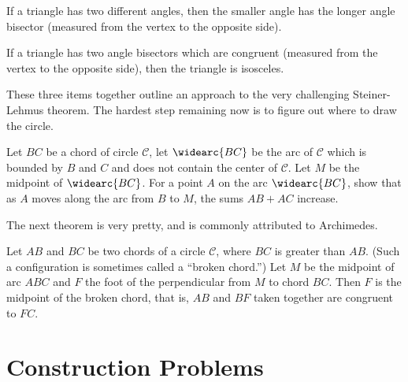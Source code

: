 \begin{conjecture}
If a triangle has two different angles, then the smaller angle has the longer angle bisector (measured from the vertex to the opposite side).
\end{conjecture}

\begin{conjecture}
If a triangle has two angle bisectors which are congruent (measured from the vertex to the opposite side), then the triangle is isosceles.
\end{conjecture}

\begin{annotation}
{
\color{blue}
These three items together outline an approach to the very challenging Steiner-Lehmus theorem. The hardest step remaining now is to figure out where to draw the circle.
}
\end{annotation}

\begin{conjecture}
Let $BC$ be a chord of circle $\mathcal{C}$, let $\widearc{BC}$ be the arc of $\mathcal{C}$ which is bounded by $B$ and $C$ and does not contain the center of $\mathcal{C}$.
Let $M$ be the midpoint of $\widearc{BC}$.
For a point $A$ on the arc $\widearc{BC}$, show that as $A$ moves along the arc from $B$ to $M$, the sums $AB+AC$ increase.
\end{conjecture}


The next theorem is very pretty, and is commonly attributed to 
Archimedes.

\begin{conjecture} Let $AB$ and $BC$ be two chords of a circle $\mathcal{C}$, where $BC$ is greater than $AB$.
(Such a configuration is sometimes called a ``broken chord.'')
Let $M$ be the midpoint of arc ${ABC}$ and $F$ the foot of the perpendicular from $M$ to chord $BC$.
Then $F$ is the midpoint of the broken chord, that is, $AB$ and $BF$ taken together are congruent to $FC$.
\end{conjecture}



\chapter{Construction Problems}

